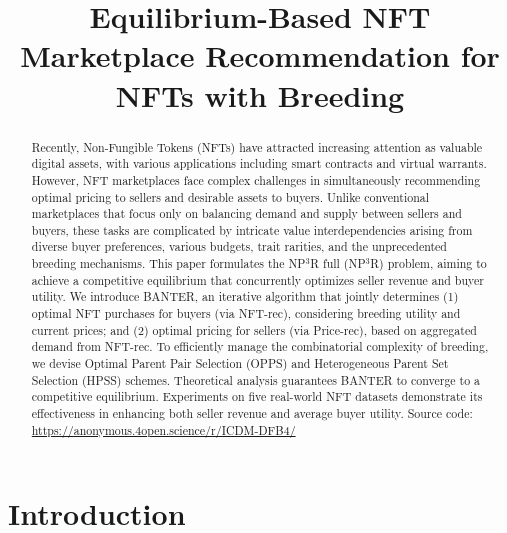 \documentclass[conference]{IEEEtran}
\theoremstyle{plain}
\begin{document}
\title{Equilibrium-Based NFT Marketplace Recommendation for NFTs with Breeding}

\author{}

\maketitle
\begin{abstract}
Recently, Non-Fungible Tokens (NFTs) have attracted increasing attention as valuable digital assets, with various applications including smart contracts and virtual warrants. However, NFT marketplaces face complex challenges in simultaneously recommending optimal pricing to sellers and desirable assets to buyers. Unlike conventional marketplaces that focus only on balancing demand and supply between sellers and buyers, these tasks are complicated by intricate value interdependencies arising from diverse buyer preferences, various budgets, trait rarities, and the unprecedented breeding mechanisms. This paper formulates the NP$^3$R full (NP$^3$R) problem, aiming to achieve a competitive equilibrium that concurrently optimizes seller revenue and buyer utility. We introduce BANTER, an iterative algorithm that jointly determines (1) optimal NFT purchases for buyers (via NFT-rec), considering breeding utility and current prices; and (2) optimal pricing for sellers (via Price-rec), based on aggregated demand from NFT-rec. To efficiently manage the combinatorial complexity of breeding, we devise Optimal Parent Pair Selection (OPPS) and Heterogeneous Parent Set Selection (HPSS) schemes. Theoretical analysis guarantees BANTER to converge to a competitive equilibrium. Experiments on five real-world NFT datasets demonstrate its effectiveness in enhancing both seller revenue and average buyer utility. Source code: \url{https://anonymous.4open.science/r/ICDM-DFB4/} \end{abstract}

\IEEEpeerreviewmaketitle

\section{Introduction}
\end{document}
